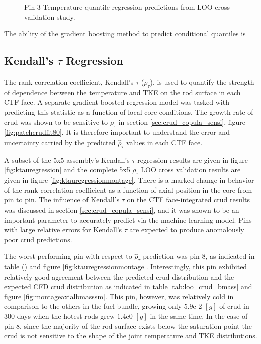 \begin{figure}[H]%
    \centering
    \qquad
    \caption[Q-Q LOO Temperature pin 3 results.]{Pin 3 Temperature quantile regression predictions from LOO cross validation study.}%
    \label{fig:temppin3}%
\end{figure}

The ability of the gradient boosting method to predict conditional quantiles is

\subsection{Kendall's $\tau$ Regression}

The rank correlation coefficient, Kendall's $\tau$ ($\rho_\tau$), is used to quantify the strength of dependence between the temperature and TKE on the rod surface in each CTF face.  A separate gradient boosted regression model was tasked with predicting this statistic as a function of local core conditions.   The growth rate of crud was shown to be sensitive to   $\rho_\tau$ in section \ref{sec:crud_copula_sensi}, figure \ref{fig:patchcrudfit80}.  It is therefore important to understand the error and uncertainty carried by the predicted $\hat \rho_\tau$ values in each CTF face.

A subset of the 5x5 assembly's Kendall's $\tau$ regression results are given in figure \ref{fig:ktauregression} and the complete 5x5 $\rho_\tau$ LOO cross validation results are given in figure \ref{fig:ktauregressionmontage}.  There is a marked change in behavior of the rank correlation coefficient as a function of axial position in the core from pin to pin.  The influence of Kendall's $\tau$ on the CTF face-integrated crud results was discussed in section \ref{sec:crud_copula_sensi}, and it was shown to be an important parameter to accurately predict via the machine learning model.  Pins with large relative errors for Kendall's $\tau$ are expected to produce anomalously poor crud predictions.

The worst performing pin with respect to $\hat \rho_\tau$ prediction was pin 8, as indicated in table () and figure \ref{fig:ktauregressionmontage}.  Interestingly, this pin exhibited relatively good agreement between the predicted crud distribution and the expected CFD crud distribution as indicated in table \ref{tab:loo_crud_bmass} and figure \ref{fig:montageaxialbmasssm}.  This pin, however, was relatively cold in comparison to the others in the fuel bundle, growing only $5.9$e-2 $[g]$ of crud in 300 days when the hotest rods grew $1.4$e0 $[g]$ in the same time.  In the case of pin 8, since the majority of the rod surface exists below the saturation point the crud is not sensitive to the shape of the joint temperature and TKE distributions.

